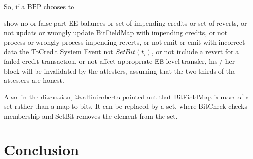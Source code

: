 \documentclass{article}
\begin{document}
So, if a BBP chooses to

show no or false
part EE-balances or
set of impending credits or
set of reverts, or
not update or wrongly update BitFieldMap with impending credits, or
not process or wrongly process impending reverts, or
not emit or emit with incorrect data the ToCredit System Event
not $SetBit(t_i)$, or
not include a revert for a failed credit transaction, or
not affect appropriate EE-level transfer,
his / her block will be invalidated by the attesters, assuming that the two-thirds of the attesters are honest.

Also, in the discussion, @saltiniroberto pointed out that BitFieldMap is more of a set rather than a map to bits. It can be replaced by a set, where BitCheck checks membership and SetBit removes the element from the set.

\section{Conclusion}



\end{document}
